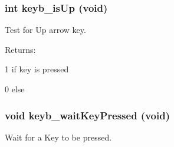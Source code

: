 \subsubsection{\setlength{\rightskip}{0pt plus 5cm}int keyb\_\-is\-Up (void)}\label{hpkeyb49_8h_a5}


Test for Up arrow key.

\begin{Desc}
\item[Returns: ]\par
1 if key is pressed \par
 0 else \end{Desc}
\subsubsection{\setlength{\rightskip}{0pt plus 5cm}void keyb\_\-wait\-Key\-Pressed (void)}\label{hpkeyb49_8h_a2}


Wait for a Key to be pressed.

